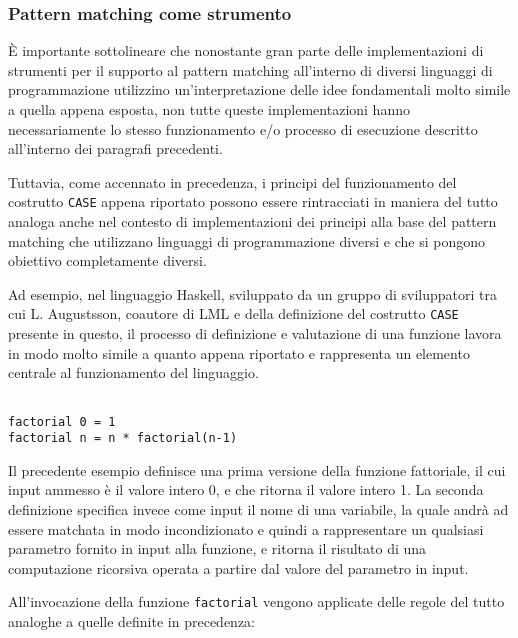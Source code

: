 \subsubsection{Pattern matching come strumento}

È importante sottolineare che nonostante gran parte delle implementazioni di
strumenti per il supporto al pattern matching all’interno di diversi linguaggi
di programmazione utilizzino un’interpretazione delle idee fondamentali molto
simile a quella appena esposta, non tutte queste implementazioni hanno
necessariamente lo stesso funzionamento e/o processo di esecuzione descritto
all'interno dei paragrafi precedenti.

Tuttavia, come accennato in precedenza, i principi del funzionamento del
costrutto \texttt{CASE} appena riportato possono essere rintracciati in maniera
del tutto analoga anche nel contesto di implementazioni dei principi alla base
del pattern matching che utilizzano linguaggi di programmazione diversi e che si
pongono obiettivo completamente diversi.

Ad esempio, nel linguaggio Haskell, sviluppato da un gruppo di sviluppatori tra
cui L. Augustsson, coautore di LML e della definizione del costrutto
\texttt{CASE} presente in questo, il processo di definizione e valutazione di
una funzione lavora in modo molto simile a quanto appena riportato e rappresenta
un elemento centrale al funzionamento del linguaggio.

\begin{lstlisting}[caption=Esempio di definizione di una funzione Haskell naïve
per il calcolo del fattoriale]

factorial 0 = 1
factorial n = n * factorial(n-1)

\end{lstlisting}

Il precedente esempio definisce una prima versione della funzione fattoriale, il
cui input ammesso è il valore intero 0, e che ritorna il valore intero 1. La
seconda definizione specifica invece come input il nome di una variabile, la
quale andrà ad essere matchata in modo incondizionato e quindi a rappresentare
un qualsiasi parametro fornito in input alla funzione, e ritorna il risultato di
una computazione ricorsiva operata a partire dal valore del parametro in input.

All’invocazione della funzione \texttt{factorial} vengono applicate delle regole
del tutto analoghe a quelle definite in precedenza:

